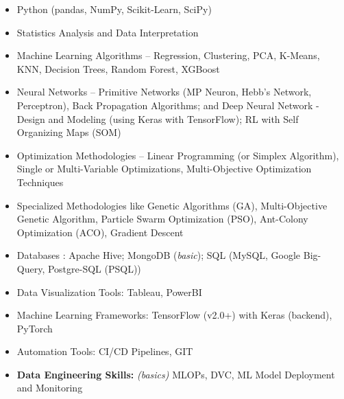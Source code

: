 
%




\begin{multicols}{2}
	\begin{itemize}
		\item Python (pandas, NumPy, Scikit-Learn, SciPy)
		\item Statistics Analysis and Data Interpretation
		\item Machine Learning Algorithms – Regression, Clustering, PCA, K-Means, KNN, Decision Trees, Random Forest, XGBoost
		\item Neural Networks – Primitive Networks (MP Neuron, Hebb’s Network, Perceptron), Back Propagation Algorithms; and Deep Neural Network - Design and Modeling (using Keras with TensorFlow); RL with Self Organizing Maps (SOM)
		\item Optimization Methodologies – Linear Programming (or Simplex Algorithm), Single or Multi-Variable Optimizations, Multi-Objective Optimization Techniques
		\item \nohyphens{Specialized Methodologies like Genetic Algorithms (GA), Multi-Objective Genetic Algorithm, Particle Swarm Optimization (PSO), Ant-Colony Optimization (ACO), Gradient Descent}
		\item Databases : Apache Hive; MongoDB (\textit{basic}); SQL (MySQL, Google Big-Query, Postgre-SQL (PSQL))
		\item Data Visualization Tools: Tableau, PowerBI
        \item Machine Learning Frameworks: TensorFlow (v2.0+) with Keras (backend), PyTorch
        \item Automation Tools: CI/CD Pipelines, GIT
		\item \textbf{Data Engineering Skills:} \textit{(basics)} MLOPs, DVC, ML Model Deployment and Monitoring
	\end{itemize}


\end{multicols}
